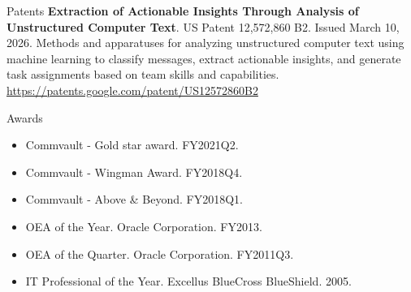 \documentclass{resume} %
\begin{document}
\begin{rSection}{Patents}
\textbf{Extraction of Actionable Insights Through Analysis of Unstructured Computer Text}. US Patent 12,572,860 B2. Issued March 10, 2026. Methods and apparatuses for analyzing unstructured computer text using machine learning to classify messages, extract actionable insights, and generate task assignments based on team skills and capabilities. \url{https://patents.google.com/patent/US12572860B2}
\end{rSection}

\begin{rSection}{Awards}
\begin{itemize}
\itemsep -3pt {}
\item Commvault - Gold star award. FY2021Q2.
\item Commvault - Wingman Award. FY2018Q4.
\item Commvault - Above \& Beyond. FY2018Q1.
\item OEA of the Year. Oracle Corporation. FY2013.
\item OEA of the Quarter. Oracle Corporation. FY2011Q3.
\item IT Professional of the Year. Excellus BlueCross BlueShield. 2005.
\end{itemize}
\end{rSection}
\end{document}
